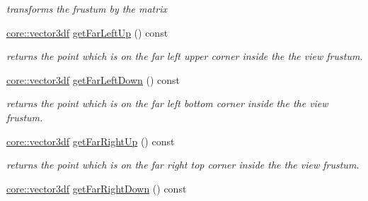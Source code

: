 \begin{DoxyCompactItemize}
\begin{DoxyCompactList}\small\item\em transforms the frustum by the matrix \end{DoxyCompactList}\item 
\mbox{\label{structirr_1_1scene_1_1SViewFrustum_aa88c3024a6d2b5dc67e53014d2632df8}} 
\hyperlink{namespaceirr_1_1core_ae6e2b2a6c552833ebbd5b7463d03586b}{core\+::vector3df} \hyperlink{structirr_1_1scene_1_1SViewFrustum_aa88c3024a6d2b5dc67e53014d2632df8}{get\+Far\+Left\+Up} () const
\begin{DoxyCompactList}\small\item\em returns the point which is on the far left upper corner inside the the view frustum. \end{DoxyCompactList}\item 
\mbox{\label{structirr_1_1scene_1_1SViewFrustum_a83216ce3be2990e7e4849bf985d89fd6}} 
\hyperlink{namespaceirr_1_1core_ae6e2b2a6c552833ebbd5b7463d03586b}{core\+::vector3df} \hyperlink{structirr_1_1scene_1_1SViewFrustum_a83216ce3be2990e7e4849bf985d89fd6}{get\+Far\+Left\+Down} () const
\begin{DoxyCompactList}\small\item\em returns the point which is on the far left bottom corner inside the the view frustum. \end{DoxyCompactList}\item 
\mbox{\label{structirr_1_1scene_1_1SViewFrustum_a2cce344ced4939aebfe3c9d9396cb4ec}} 
\hyperlink{namespaceirr_1_1core_ae6e2b2a6c552833ebbd5b7463d03586b}{core\+::vector3df} \hyperlink{structirr_1_1scene_1_1SViewFrustum_a2cce344ced4939aebfe3c9d9396cb4ec}{get\+Far\+Right\+Up} () const
\begin{DoxyCompactList}\small\item\em returns the point which is on the far right top corner inside the the view frustum. \end{DoxyCompactList}\item 
\mbox{\label{structirr_1_1scene_1_1SViewFrustum_ab1bf1b3cf323812ed4259268ce7ecf76}} 
\hyperlink{namespaceirr_1_1core_ae6e2b2a6c552833ebbd5b7463d03586b}{core\+::vector3df} \hyperlink{structirr_1_1scene_1_1SViewFrustum_ab1bf1b3cf323812ed4259268ce7ecf76}{get\+Far\+Right\+Down} () const

\end{DoxyCompactItemize}
